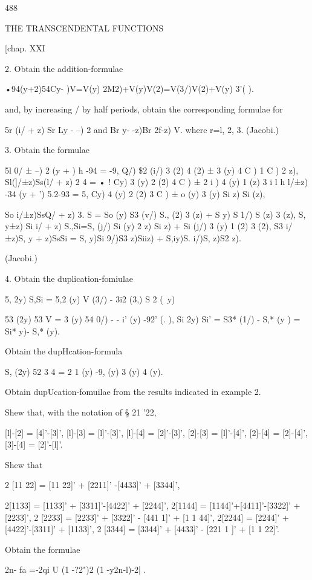 488

THE TRANSCENDENTAL FUNCTIONS

[chap. XXI

2. Obtain the addition-formulae

•94(y+2)54Cy- )V=V(y) 2M2)+V(y)V(2)=V(3/)V(2)+V(y) 3'( ).

and, by increasing / by half periods, obtain the corresponding
formulae for

5r (i/ + z) Sr Ly - --) 2 and Br y- -z)Br 2f-z) V. where r=l, 2, 3.
(Jacobi.)

3. Obtain the formulae

5l 0/ ± --) 2 (y + ) h -94 = -9, Q/) \$2 (i/) 3 (2) 4 (2) ± 3 (y) 4 C
) 1 C ) 2 z), Sl(]/±z)Ss(l/ + z) 2 4 = • ! Cy) 3 (y) 2 (2) 4 C ) ± 2 i
) 4 (y) 1 (z) 3 i l h l/±z) -34 (y + ') 5.2-93 = 5, Cy) 4 (y) 2 (2) 3
C ) ± o (y) 3 (y) Si z) Si (z),

So i/±z)SsQ/ + z) 3. S = So (y) S3 (v/) S., (2) 3 (z) + S y) S 1/) S
(z) 3 (z), S, y±z) Si i/ + z) S.,Si=S, (j/) Si (y) 2 z) Si z) + Si
(j/) 3 (y) 1 (2) 3 (2), S3 i/±z)S, y + z)SsSi = S, y)Si 9/)S3 z)Siiz)
+ S,iy)S. i/)S, z)S2 z).

(Jacobi.)

4. Obtain the duplication-fomiulae

5, 2y) S,Si = 5,2 (y) V (3/) - 3i2 (3,) S 2 (\ y)

53 (2y) 53 V = 3 (y) 54 0/) - - i' (y) -92' (. ), Si 2y) Si' = S3*
(1/) - S,* (y ) = Si* y)- S,* (y).

Obtain the dupHcation-formula

S, (2y) 52 3 4 = 2 1 (y) -9, (y) 3 (y) 4 (y).

Obtain dupUcation-fomuilae from the results indicated in example 2.

Shew that, with the notation of § 21 '22,

[l]-[2] = [4]'-[3]', [l]-[3] = [l]'-[3]', [l]-[4] = [2]'-[3]', [2]-[3]
= [l]'-[4]', [2]-[4] = [2]-[4]', [3]-[4] = [2]'-[l]'.

Shew that

2 [11 22] = [11 22]' + [2211]' -[4433]' + [3344]',

2[1133] = [1133]' + [3311]'-[4422]' + [2244]', 2[1144] =
[1144]'+[4411]'-[3322]' + [2233]', 2 [2233] = [2233]' + [3322]' - [441
1]' + [1 1 44]', 2[2244] = [2244]' + [4422]'-[3311]' + [1133]', 2
[3344] = [3344]' + [4433]' - [221 1 ]' + [1 1 22]'.

Obtain the formulae

2n- fa =-2qi U (1 -?2")2 (1 -y2n-l)-2| .


